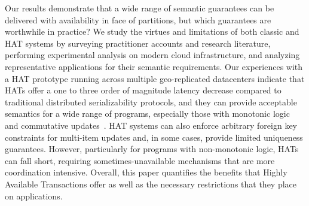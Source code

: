 Our results demonstrate that a wide range of semantic guarantees can
be delivered with availability in face of partitions, but which
guarantees are worthwhile in practice? We study the virtues and
limitations of both classic and HAT systems by surveying practitioner
accounts and research literature, performing experimental analysis on
modern cloud infrastructure, and analyzing representative applications
for their semantic requirements. Our experiences with a HAT prototype
running across multiple geo-replicated datacenters indicate that HATs
offer a one to three order of magnitude latency decrease compared to
traditional distributed serializability protocols, and they can
provide acceptable semantics for a wide range of programs, especially
those with monotonic logic and commutative updates~\cite{calm,
  crdt}. HAT systems can also enforce arbitrary foreign key
constraints for multi-item updates and, in some cases, provide limited
uniqueness guarantees. However, particularly for programs with
non-monotonic logic, HATs can fall short, requiring
sometimes-unavailable mechanisms that are more coordination
intensive. Overall, this paper quantifies the benefits that Highly
Available Transactions offer as well as the necessary restrictions
that they place on applications.




